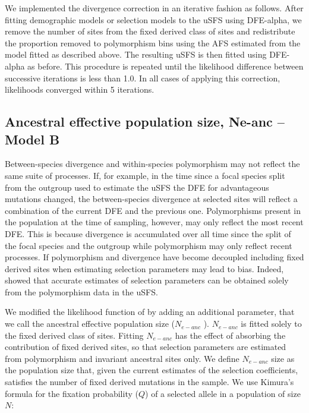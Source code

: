 We implemented the divergence correction in an iterative fashion as follows. After fitting demographic models or selection models to the uSFS using DFE-alpha, we remove the number of sites from the fixed derived class of sites and redistribute the proportion removed to polymorphism bins using the AFS estimated from the model fitted as described above. The resulting uSFS is then fitted using DFE-alpha as before. This procedure is repeated until the likelihood difference between successive iterations is less than 1.0. In all cases of applying this correction, likelihoods converged within 5 iterations.

\subsection{Ancestral effective population size, Ne-anc – Model B}

Between-species divergence and within-species polymorphism may not reflect the same suite of processes. If, for example, in the time since a focal species split from the outgroup used to estimate the uSFS the DFE for advantageous mutations changed, the between-species divergence at selected sites will reflect a combination of the current DFE and the previous one. Polymorphisms present in the population at the time of sampling, however, may only reflect the most recent DFE. This is because divergence is accumulated over all time since the split of the focal species and the outgroup while polymorphism may only reflect recent processes. If polymorphism and divergence have become decoupled including fixed derived sites when estimating selection parameters may lead to bias. Indeed,  \cite{RN354} showed that accurate estimates of selection parameters can be obtained solely from the polymorphism data in the uSFS. 

We modified the likelihood function of \cite{RN210} by adding an additional parameter, that we call the ancestral effective population size ($N_{e-anc}$ ). $N_{e-anc}$  is fitted solely to the fixed derived class of sites. Fitting $N_{e-anc}$  has the effect of absorbing the contribution of fixed derived sites, so that selection parameters are estimated from polymorphism and invariant ancestral sites only. We define $N_{e-anc}$ size as the population size that, given the current estimates of the selection coefficients, satisfies the number of fixed derived mutations in the sample. We use Kimura’s formula for the fixation probability ($Q$) of a selected allele in a population of size $N$:

